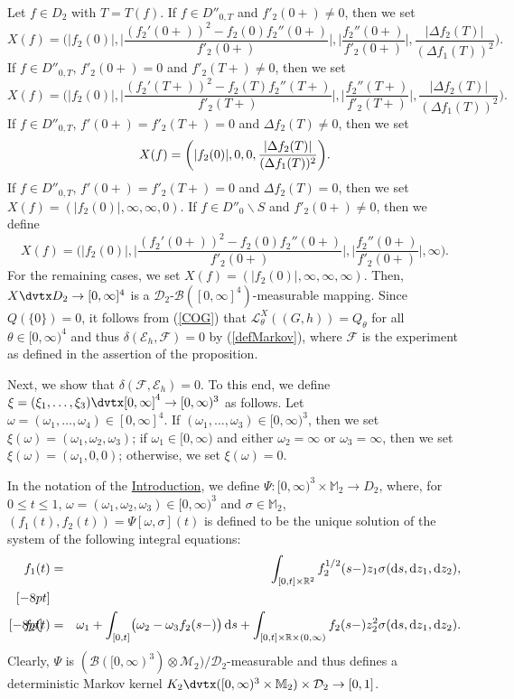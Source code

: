 \documentclass[number,citesort,seceqn,dvips]{arxbj}
\newcommand{\eqref}[1]{(\ref{#1})}
\newcommand{\RR}{\mathbb{R}}
\newcommand{\MM}{\mathbb{M}}
\newcommand{\MMM}{{\mathcal M}}
\newcommand{\BBB}{{\mathcal B}}
\newcommand{\DDD}{{\mathcal D}}
\newcommand{\EEE}{{\mathcal E}}
\newcommand{\FFF}{{\mathcal F}}
\newcommand{\LLL}{{\mathcal L}}
\begin{document}
Let $f\in D_2$ with $T=T(f)$. If $f\in D''_{0,T}$ and $f'_2(0+)\neq0$,
then we set
%
\[
X(f) =  \biggl(|f_2(0)|, \biggl|\frac{(f_2'(0+))^2 -
f_2(0)f_2''(0+)}{f'_2(0+)} \biggr|,
 \biggl|\frac{f_2''(0+)}{f'_2(0+)} \biggr|,\frac{|\Delta
f_2(T)|}{(\Delta
f_1(T))^2} \biggr) .
\]
%
If $f\in D''_{0,T}$, $f'_2(0+)= 0$ and
$f'_2(T+)\neq0$, then we set
%
\[
X(f) =  \biggl(|f_2(0)|, \biggl|\frac{(f_2'(T+))^2 -
f_2(T)f_2''(T+)}{f'_2(T+)} \biggr|,
 \biggl|\frac{f_2''(T+)}{f'_2(T+)} \biggr|,\frac{|\Delta
f_2(T)|}{(\Delta
f_1(T))^2} \biggr) .
\]
%
If $f\in D''_{0,T}$, $f'(0+)=f'_2(T+)=0$ and
$\Delta f_2(T)\neq0$, then we set
%
\[
X(f) =  \biggl(|f_2(0)|,0,0
,\frac{|\Delta f_2(T)|}{(\Delta f_1(T))^2} \biggr) .\vadjust{\goodbreak}
\]
%
If $f\in
D''_{0,T}$, $f'(0+)=f'_2(T+)=0$ and $\Delta f_2(T)= 0$, then we set
$X(f)=(|f_2(0)|,\infty,\infty,0)$. If $f\in D''_{0}\backslash S$ and
$f'_2(0+)\neq0$, then we define
%
\[
X(f) =  \biggl(|f_2(0)|,  \biggl|\frac{(f_2'(0+))^2 -
f_2(0)f_2''(0+)}{f'_2(0+)} \biggr|,
 \biggl|\frac{f_2''(0+)}{f'_2(0+)} \biggr|,\infty \biggr) .
\]
%
For the
remaining cases, we set
$X(f)=  (|f_2(0)|,\infty,\infty,\infty )$. Then,
$X\dvtx D_2\to[0,\infty]^4$ is a $\DDD_2$-$\BBB([0,\infty]^4)$-measurable
mapping. Since $Q(\{0\})=0$, it follows from \eqref{COG} that
$\LLL_\theta^X((G,h))=Q_{\theta}$ for all $\theta\in[0,\infty)^4$ and
thus $\delta(\EEE_{h},\FFF)=0$ by \eqref{defMarkov}, where $\FFF$ is
the experiment as defined in the assertion of the proposition.

Next, we show that $\delta(\FFF,\EEE_h)=0$. To this end, we define
$\xi=(\xi_1,\dots,\xi_3)\dvtx[0,\infty]^4\to[0,\infty)^3$ as
follows. Let
$\omega=(\omega_1,\dots,\omega_4)\in[0,\infty]^4$. If
$(\omega_1,\dots,\omega_3)\in[0,\infty)^3$, then we set
$\xi(\omega)=(\omega_1,\omega_2,\omega_3)$; if $\omega_1\in
[0,\infty)$
and either $\omega_2=\infty$ or $\omega_3=\infty$, then we set
$\xi(\omega)=(\omega_1,0,0)$; otherwise, we set $\xi(\omega)=0$.

In the notation of the \hyperref[s1]{Introduction}, we define $\Psi:
[0,\infty)^3\times\MM_2\to D_2$, where, for $0\le t\le1$,
$\omega=(\omega_1,\omega_2,\omega_3)\in[0,\infty)^3$ and
$\sigma\in\MM_2$, $(f_1(t),f_2(t))=\Psi[\omega,\sigma](t)$ is defined
to be the unique solution of the system of the following integral
equations:
%
\begin{eqnarray}\label{COGth4}
\hspace*{-15pt}f_1(t) & =  & \int_{[0,t]\times\RR^2}
f_2^{1/2}(s-)z_1 \sigma(\mathrm{d}s,\mathrm{d}z_1,\mathrm{d}z_2) ,\nonumber \\ [-8pt]\\ [-8pt]
\hspace*{-15pt}f_2(t) &  =  & \omega_1 + \int_{[0,t]}\bigl(\omega_2-\omega_3
f_2(s-)\bigr)\,\mathrm{d}s + \int_{[0,t]\times\RR\times(0,\infty)}
f_2(s-)z_2^2 \sigma(\mathrm{d}s,\mathrm{d}z_1,\mathrm{d}z_2) .\nonumber
\end{eqnarray}
%
Clearly, $\Psi$ is
$(\BBB([0,\infty)^3)\otimes\MMM_2)/\DDD_2$-measurable and thus defines
a deterministic Markov kernel
$K_2\dvtx([0,\infty)^3\times\MM_2)\times\DDD_2\to[0,1]$.
\end{document}
